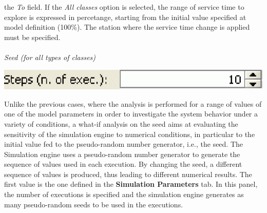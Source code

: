 \begin{description*}
the \emph{To} field. 
If the \emph{All classes} option is selected, the range of service time to explore is expressed in percetange, starting from the initial value specified at model definition (100\%). The station where the service time change is applied must be specified.\\\\
\textit{Seed (for all types of classes)}
\begin{center}
\includegraphics[scale=.5]{img/jsim/sedd.eps}
\end{center}
Unlike the previous cases, where the analysis is performed for a range of values of one of the model parameters in order to investigate the system behavior under a variety of conditions, a what-if analysis on the seed aims at evaluating the sensitivity of the simulation engine to numerical conditions, in particular to the initial value fed to the pseudo-random number generator, i.e., the seed.
The Simulation engine uses a pseudo-random number generator to generate the sequence of values used in each execution. By changing the seed, a different sequence of values is produced, thus leading to different numerical results. The first value is the one defined in the \textbf{Simulation Parameters} tab. In this panel, the number of executions is specified and the simulation engine generates as many pseudo-random seeds to be used in the executions.


\end{description*}
